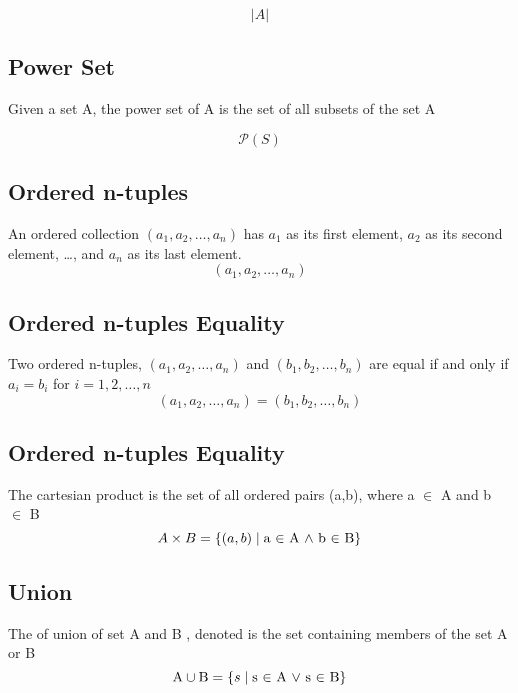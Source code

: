 \documentclass[12pt]{article}
\begin{document}
\begin{equation}
\left| {A} \right|
\end{equation}

\subsection{Power Set}
Given a set A, the power set of A is the set of all subsets of the set A 

\begin{equation}
\mathcal P \left({S}\right)
\end{equation}

\subsection{Ordered n-tuples}
An ordered collection $(a_1, a_2, \ldots, a_n)$ has $a_1$ as its first element, $a_2$ as its second element, \ldots, and $a_n$ as its last element.
\begin{equation}
(a_1, a_2, \ldots, a_n)
\end{equation}

\subsection{Ordered n-tuples Equality}
Two ordered n-tuples, $(a_1, a_2, \ldots, a_n)$ and $(b_1, b_2, \ldots, b_n)$ are equal
if and only if $a_i = b_i$ for $i = 1,2,\ldots,n$
\begin{equation}
(a_1, a_2, \ldots, a_n) = (b_1, b_2, \ldots, b_n)
\end{equation}

\subsection{Ordered n-tuples Equality}
The cartesian product is the set of all ordered pairs (a,b), where a $\in$ A and b $\in$ B
\begin{equation}
A \times B = \{(a,b)\mid\text{a $\in$ A $\wedge$ b $\in$ B}\}
$$
$$\end{equation}

\subsection{Union}
The of union of set A and B , denoted 
is the set containing members of the set A or B
\begin{equation}
\mbox{A} \cup \mbox{B} = \{s\mid\text{s $\in$ A $\lor$ s $\in$ B}\}$$
$$\end{equation}
\end{document}
